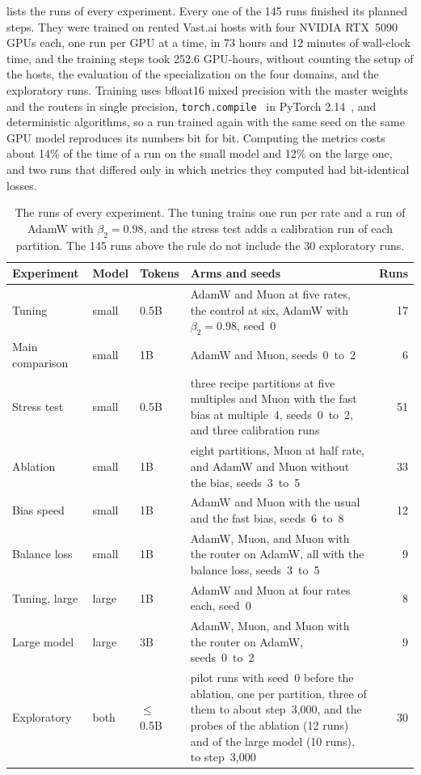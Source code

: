 \documentclass[11pt, a4paper]{article}
\begin{document}
 lists the runs of every experiment. Every one of the 145 runs finished its planned steps. They were trained on rented Vast.ai hosts with four NVIDIA RTX~5090 GPUs each, one run per GPU at a time, in 73 hours and 12 minutes of wall-clock time, and the training steps took 252.6 GPU-hours, without counting the setup of the hosts, the evaluation of the specialization on the four domains, and the exploratory runs. Training uses bfloat16 mixed precision with the master weights and the routers in single precision, \texttt{torch.compile}~\citep{ansel2024pytorch2} in PyTorch 2.14~\citep{paszke2019pytorch}, and deterministic algorithms, so a run trained again with the same seed on the same GPU model reproduces its numbers bit for bit. Computing the metrics costs about 14\% of the time of a run on the small model and 12\% on the large one, and two runs that differed only in which metrics they computed had bit-identical losses.

\begin{table}[ht]
  \centering
  \caption{The runs of every experiment. The tuning trains one run per rate and a run of AdamW with $\beta_2 = 0.98$, and the stress test adds a calibration run of each partition. The 145 runs above the rule do not include the 30 exploratory runs.}
  \label{tab:runs}
  \small
  \setlength{\tabcolsep}{4pt}
  \begin{tabular}{@{}lll>{\raggedright\arraybackslash}p{8.95cm}r@{}}
    \toprule
    Experiment & Model & Tokens & Arms and seeds & Runs \\
    \midrule
    Tuning & small & 0.5B & AdamW and Muon at five rates, the control at six, AdamW with $\beta_2 = 0.98$, seed~0 & 17 \\ \addlinespace[2pt]
    Main comparison & small & 1B & AdamW and Muon, seeds~0~to~2 & 6 \\ \addlinespace[2pt]
    Stress test & small & 0.5B & three recipe partitions at five multiples and Muon with the fast bias at multiple~4, seeds~0~to~2, and three calibration runs & 51 \\ \addlinespace[2pt]
    Ablation & small & 1B & eight partitions, Muon at half rate, and AdamW and Muon without the bias, seeds~3~to~5 & 33 \\ \addlinespace[2pt]
    Bias speed & small & 1B & AdamW and Muon with the usual and the fast bias, seeds~6~to~8 & 12 \\ \addlinespace[2pt]
    Balance loss & small & 1B & AdamW, Muon, and Muon with the router on AdamW, all with the balance loss, seeds~3~to~5 & 9 \\ \addlinespace[2pt]
    Tuning, large & large & 1B & AdamW and Muon at four rates each, seed~0 & 8 \\ \addlinespace[2pt]
    Large model & large & 3B & AdamW, Muon, and Muon with the router on AdamW, seeds~0~to~2 & 9 \\
    \midrule
    Exploratory & both & ${\leq}\,$0.5B & 8 pilot runs with seed~0 before the ablation, one per partition, three of them to about step~3,000, and the probes of the ablation (12 runs) and of the large model (10 runs), to step~3,000 & 30 \\
    \bottomrule
  \end{tabular}
\end{table}
\end{document}
